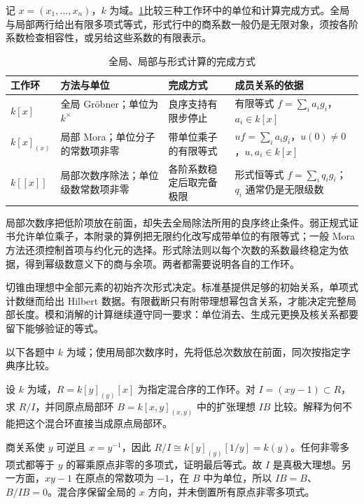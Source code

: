\ProseParagraphBreak
记 \(x=(x_1,\ldots,x_n)\)，\(k\) 为域。\cref{b3:tab:F-computational-settings}比较三种工作环中的单位和计算完成方式。全局与局部两行给出有限多项式等式，形式行中的商系数一般仍是无限对象，须按各阶系数检查相容性，或另给这些系数的有限表示。

\begin{table}[htbp]
	\centering
	\caption{全局、局部与形式计算的完成方式}
	\label{b3:tab:F-computational-settings}
	\begin{tabularx}{\textwidth}{@{}>{\raggedright\arraybackslash}p{}>{\raggedright\arraybackslash}p{}>{\raggedright\arraybackslash}p{}>{\raggedright\arraybackslash}X@{}}
		\toprule
		工作环 & 方法与单位 & 完成方式 & 成员关系的依据 \\
		\midrule
		\(k[x]\) & 全局 Gröbner；单位为 \(k^\times\) & 良序支持有限步停止 & 有限等式 \(f=\sum_i a_i g_i\)，\(a_i\in k[x]\) \\
		\(k[x]_{(x)}\) & 局部 Mora；单位分子的常数项非零 & 带单位乘子的有限等式 & \(uf=\sum_i a_i g_i\)，\(u(0)\ne0\)，\(u,a_i\in k[x]\) \\
		\(k[\![x]\!]\) & 局部次数序除法；单位级数常数项非零 & 各阶系数稳定后取完备极限 & 形式恒等式 \(f=\sum_i q_i g_i\)；\(q_i\) 通常仍是无限级数 \\
		\bottomrule
	\end{tabularx}
\end{table}






\begin{chaptersummary}
	局部次数序把低阶项放在前面，却失去全局除法所用的良序终止条件。弱正规式证书允许单位乘子，本附录的算例把无限约化改写成带单位的有限等式；一般 Mora 方法还须控制首项与约化元的选择。形式除法则以每个次数的系数最终稳定为依据，得到幂级数意义下的商与余项。两者都需要说明各自的工作环。

	\ProseParagraphBreak
	切锥由理想中全部元素的初始齐次形式决定。标准基提供足够的初始关系，单项式计数继而给出 Hilbert 数据。有限截断只有附带理想幂包含关系，才能决定完整局部长度。模和消解的计算继续遵守同一要求：单位消去、生成元更换及核关系都要留下能够验证的等式。
\end{chaptersummary}

\BookExercises
以下各题中 \(k\) 为域；使用局部次数序时，先将低总次数放在前面，同次按指定字典序比较。

\begin{exercise}\label{b3:ex:F-mixed-order}
	设 \(k\) 为域，\(R=k[y]_{(y)}[x]\) 为指定混合序的工作环。对 \(I=(xy-1)\subset R\)，求 \(R/I\)，并同原点局部环 \(B=k[x,y]_{(x,y)}\) 中的扩张理想 \(IB\) 比较。解释为何不能把这个混合环直接当成原点局部环。
\end{exercise}
\begin{solution}
	商关系使 \(y\) 可逆且 \(x=y^{-1}\)，因此 \(R/I\cong k[y]_{(y)}[1/y]=k(y)\)。任何非零多项式都等于 \(y\) 的幂乘原点非零的多项式，证明最后等式。故 \(I\) 是真极大理想。另一方面，\(xy-1\) 在原点的常数项为 \(-1\)，在 \(B\) 中为单位，所以 \(IB=B\)、\(B/IB=0\)。混合序保留全局的 \(x\) 方向，并未倒置所有原点非零多项式。
\end{solution}

